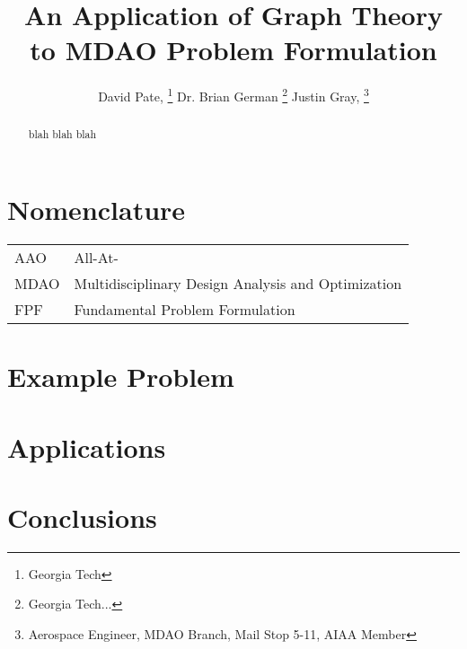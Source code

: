 \documentclass[]{aiaa-tc} %
\title{An Application of Graph Theory to MDAO Problem Formulation}
\author{
  David Pate, %
     \thanks{Georgia Tech}
  Dr. Brian German 
     \thanks{Georgia Tech...}
  Justin Gray,%
     \thanks{Aerospace Engineer, MDAO Branch, Mail Stop 5-11, AIAA Member}   
 }
\begin{document}
\maketitle
 
\begin{abstract}
   blah blah blah
\end{abstract}

\section*{Nomenclature}

\begin{tabular}{l l} 
    AAO      & All-At- \\
    MDAO     & Multidisciplinary Design Analysis and Optimization \\
    FPF      & Fundamental Problem Formulation \\
\end{tabular}





    
\section{Example Problem}

\section{Applications}

\section{Conclusions}


\end{document}
